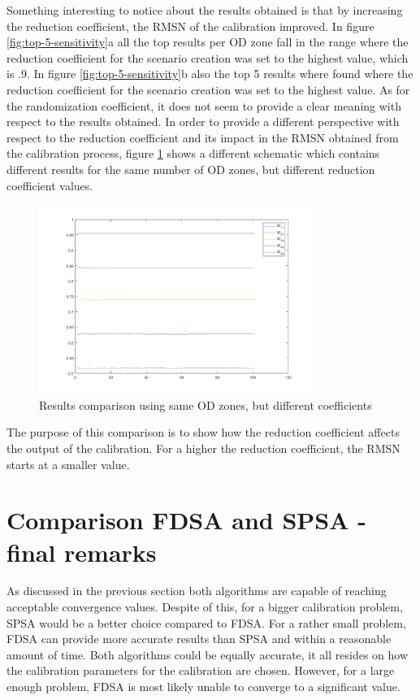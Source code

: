 Something interesting to notice about the results obtained is that by increasing the reduction coefficient, the RMSN of the calibration improved. In figure \ref{fig:top-5-sensitivity}a all the top results per OD zone fall in the range where the reduction coefficient for the scenario creation was set to the highest value, which is .9. In figure \ref{fig:top-5-sensitivity}b also the top 5 results where found where the reduction coefficient for the scenario creation was set to the highest value. As for the randomization coefficient, it does not seem to provide a clear meaning with respect to the results obtained. In order to provide a different perspective with respect to the reduction coefficient and its impact in the RMSN obtained from the calibration process, figure \ref{fig:top-sensitivity} shows a different schematic which contains different results for the same number of OD zones, but different reduction coefficient values.  

\begin{figure}[htpb]
  \centering
  \includegraphics[width=0.8\textwidth]{figures/top-sensitivity.png}
  \caption{Results comparison using same OD zones, but different coefficients}
  \label{fig:top-sensitivity}
\end{figure}

The purpose of this comparison is to show how the reduction coefficient affects the output of the calibration. For a higher the reduction coefficient, the RMSN starts at a smaller value. 

\section{Comparison FDSA and SPSA - final remarks}
As discussed in the previous section both algorithms are capable of reaching acceptable convergence values. Despite of this, for a bigger calibration problem, SPSA would be a better choice compared to FDSA. For a rather small problem, FDSA can provide more accurate results than SPSA and within a reasonable amount of time. Both algorithms could be equally accurate, it all resides on how the calibration parameters for the calibration are chosen. However, for a large enough problem, FDSA is most likely unable to converge to a significant value.  